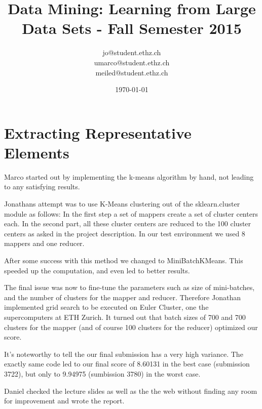 \documentclass[a4paper, 11pt]{article}
\title{Data Mining: Learning from Large Data Sets - Fall Semester 2015}
\author{jo@student.ethz.ch\\ umarco@student.ethz.ch\\ meiled@student.ethz.ch\\}
\date{\today}
\begin{document}
\maketitle

\section*{Extracting Representative Elements}

Marco started out by implementing the k-means algorithm by hand, not leading to any satisfying results.

Jonathans attempt was to use K-Means clustering out of the sklearn.cluster module as follows: In the first step a set of mappers create a set of cluster centers each. In the second part, all these cluster centers are reduced to the 100 cluster centers as asked in the project description. In our test environment we used 8 mappers and one reducer. 

After some success with this method we changed to MiniBatchKMeans. This speeded up the computation, and even led to better results.

The final issue was now to fine-tune the parameters such as size of mini-batches, and the number of clusters for the mapper and reducer. Therefore Jonathan implemented grid search to be executed on Euler Cluster, one the supercomputers at ETH Zurich. It turned out that batch sizes of 700 and 700 clusters for the mapper (and of course 100 clusters for the reducer) optimized our score.

It's noteworthy to tell the our final submission has a very high variance. The exactly same code led to our final score  of 8.60131 in the best case (submission 3722), but only to  9.94975 (sumbission 3780) in the worst case.

Daniel checked the lecture slides as well as the the web without finding any room for improvement and wrote the report.
\end{document}
